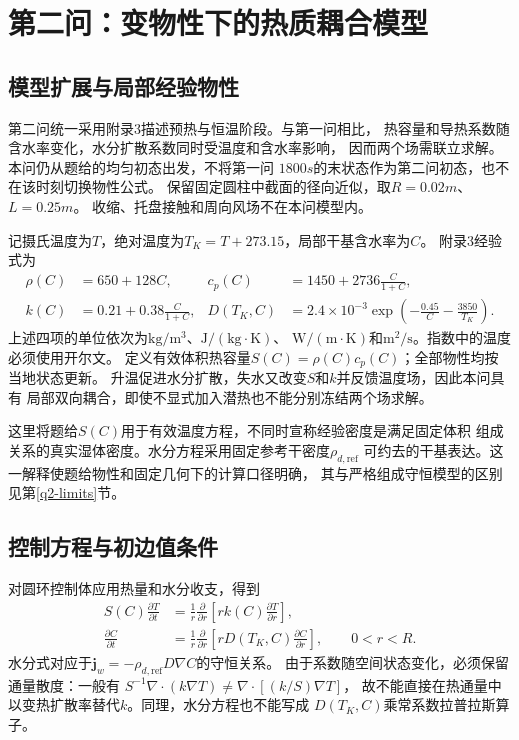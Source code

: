 \section{第二问：变物性下的热质耦合模型}
\label{q2-model}

\subsection{模型扩展与局部经验物性}
第二问统一采用附录3描述预热与恒温阶段\cite{problem}。与第一问相比，
热容量和导热系数随含水率变化，水分扩散系数同时受温度和含水率影响，
因而两个场需联立求解。本问仍从题给的均匀初态出发，不将第一问
$1800\unit{s}$的末状态作为第二问初态，也不在该时刻切换物性公式。
保留固定圆柱中截面的径向近似，取$R=0.02\unit{m}$、$L=0.25\unit{m}$。
收缩、托盘接触和周向风场不在本问模型内。

记摄氏温度为$T$，绝对温度为$T_K=T+273.15$，局部干基含水率为$C$。
附录3经验式为
\begin{equation}
\begin{aligned}
\rho(C)&=650+128C,&
c_p(C)&=1450+2736\frac{C}{1+C},\\
k(C)&=0.21+0.38\frac{C}{1+C},&
D(T_K,C)&=2.4\times10^{-3}
 \exp\!\left(-\frac{0.45}{C}-\frac{3850}{T_K}\right).
\end{aligned}
\label{q2-eq-properties}
\end{equation}
上述四项的单位依次为$\mathrm{kg/m^3}$、$\mathrm{J/(kg\cdot K)}$、
$\mathrm{W/(m\cdot K)}$和$\mathrm{m^2/s}$。指数中的温度必须使用开尔文。
定义有效体积热容量$S(C)=\rho(C)c_p(C)$；全部物性均按当地状态更新。
升温促进水分扩散，失水又改变$S$和$k$并反馈温度场，因此本问具有
局部双向耦合，即使不显式加入潜热也不能分别冻结两个场求解。

这里将题给$S(C)$用于有效温度方程，不同时宣称经验密度是满足固定体积
组成关系的真实湿体密度。水分方程采用固定参考干密度$\rho_{d,\mathrm{ref}}$
可约去的干基表达。这一解释使题给物性和固定几何下的计算口径明确，
其与严格组成守恒模型的区别见第\ref{q2-limits}节。

\subsection{控制方程与初边值条件}
对圆环控制体应用热量和水分收支，得到
\begin{align}
 S(C)\frac{\partial T}{\partial t}
 &=\frac{1}{r}\frac{\partial}{\partial r}
   \left[rk(C)\frac{\partial T}{\partial r}\right],
 \label{q2-eq-heat}\\
 \frac{\partial C}{\partial t}
 &=\frac{1}{r}\frac{\partial}{\partial r}
   \left[rD(T_K,C)\frac{\partial C}{\partial r}\right],
 \qquad 0<r<R.
 \label{q2-eq-moisture}
\end{align}
水分式对应于$\boldsymbol j_w=-\rho_{d,\mathrm{ref}}D\nabla C$的守恒关系。
由于系数随空间状态变化，必须保留通量散度：一般有
$S^{-1}\nabla\cdot(k\nabla T)\ne\nabla\cdot[(k/S)\nabla T]$，
故不能直接在热通量中以变热扩散率替代$k$。同理，水分方程也不能写成
$D(T_K,C)$乘常系数拉普拉斯算子。

